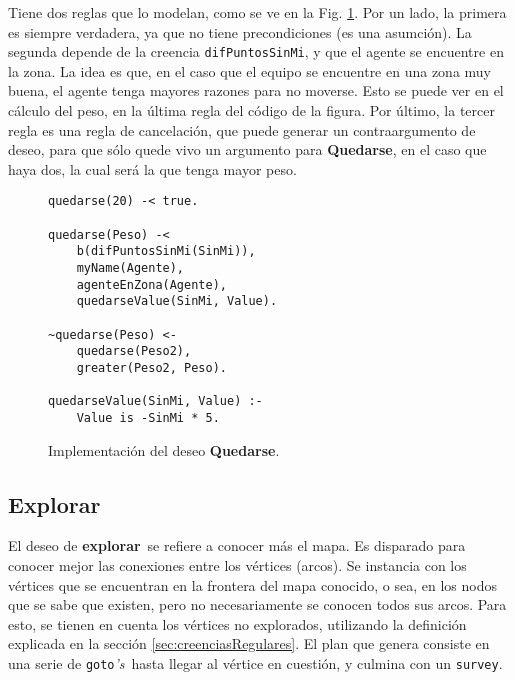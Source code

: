 \documentclass[oneside]{book}
\begin{document}
Tiene dos reglas que lo modelan, como se ve en la Fig. \ref{fig:deseoQuedarse}. Por un
lado, la primera es siempre verdadera, ya que no tiene precondiciones (es una asumción).
La segunda depende de la creencia \texttt{difPuntosSinMi}, y que el agente se encuentre
en la zona. La idea es que, en el caso que el equipo se encuentre en una zona muy buena,
el agente tenga mayores razones para no moverse. Esto se puede ver en el cálculo del 
peso, en la última regla del código de la figura. Por último, la tercer regla es una
regla de cancelación, que puede generar un contraargumento de deseo, para que sólo quede 
vivo un argumento para \textbf{Quedarse}, en
el caso que haya dos, la cual será la que tenga mayor peso.

\begin{figure}
\begin{verbatim}
quedarse(20) -< true.

quedarse(Peso) -< 
    b(difPuntosSinMi(SinMi)),
    myName(Agente),
    agenteEnZona(Agente),
    quedarseValue(SinMi, Value).

~quedarse(Peso) <-
    quedarse(Peso2),
    greater(Peso2, Peso).

quedarseValue(SinMi, Value) :-   
    Value is -SinMi * 5.
\end{verbatim}
\caption{Implementación del deseo \textbf{Quedarse}.}
\label{fig:deseoQuedarse}
\end{figure}

\subsection{Explorar}

El deseo de \textbf{explorar}\ se refiere a conocer más el mapa. Es disparado para 
conocer mejor las conexiones entre los vértices (arcos). Se instancia con los vértices
que se encuentran en la frontera del mapa conocido, o sea, en los nodos que se sabe
que existen, pero no necesariamente se conocen todos sus arcos. Para esto, se tienen en 
cuenta los vértices no explorados, utilizando la definición explicada en la 
sección \ref{sec:creenciasRegulares}. El plan que genera 
consiste en una serie de \texttt{goto}\textit{'s}\ hasta llegar al vértice en cuestión, y 
culmina con un \texttt{survey}.


\end{document}
